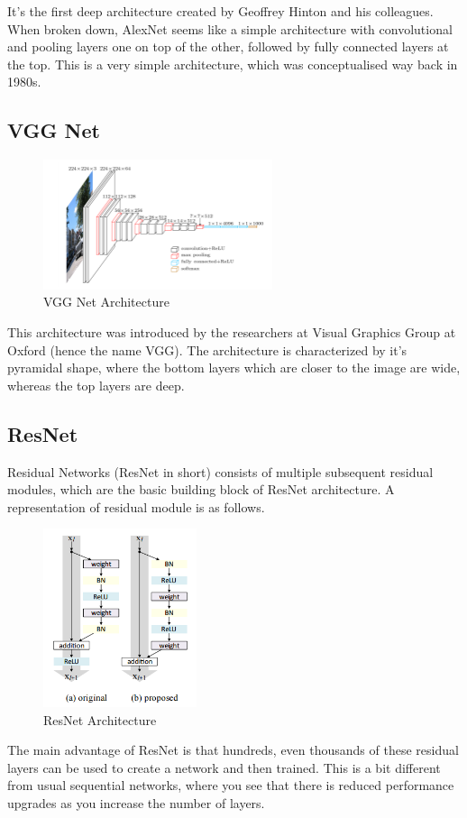 It's the first deep architecture created by Geoffrey Hinton and his colleagues. When broken down, AlexNet seems like a simple architecture with convolutional and pooling layers one on top of the other, followed by fully connected layers at the top. This is a very simple architecture, which was conceptualised way back in 1980s.

\subsection[VGG Net]{VGG Net}

\begin{figure}[H]
\centering
\includegraphics[width=0.6\textwidth]{./figures/VGGNet}
\caption{VGG Net Architecture}
\end{figure}
This architecture was introduced by the researchers at Visual Graphics Group at Oxford (hence the name VGG).
The architecture is characterized by it's pyramidal shape, where the bottom layers which are closer to the image are wide, whereas the top layers are deep.


\subsection[ResNet]{ResNet}

Residual Networks (ResNet in short) consists of multiple subsequent residual modules, which are the basic building block of ResNet architecture. A representation of residual module is as follows.


\begin{figure}[H]
\centering
\includegraphics[width=0.4\textwidth]{./figures/ResNet}
\caption{ResNet Architecture}
\end{figure}

The main advantage of ResNet is that hundreds, even thousands of these residual layers can be used to create a network and then trained. This is a bit different from usual sequential networks, where you see that there is reduced performance upgrades as you increase the number of layers.


